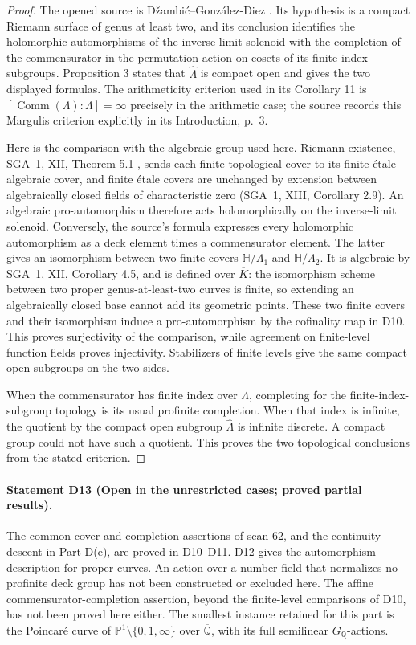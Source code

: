 \begin{proof}
The opened source is D\v zambi\'c--Gonz\'alez-Diez
\cite[Theorem 7 and Proposition 3]{D_DzambicGonzalezDiez}.
Its hypothesis is a compact Riemann surface of genus at least two,
and its conclusion identifies the holomorphic automorphisms of the
inverse-limit solenoid with the completion of the commensurator in
the permutation action on cosets of its finite-index subgroups.
Proposition 3 states that $\widehat\Lambda$ is compact open and gives
the two displayed formulas.  The arithmeticity criterion used in its
Corollary 11 is
$[\operatorname{Comm}(\Lambda):\Lambda]=\infty$ precisely in the
arithmetic case; the source records this Margulis criterion explicitly
in its Introduction, p.~3.

Here is the comparison with the algebraic group used here.  Riemann
existence, SGA~1, XII, Theorem 5.1 \cite{D_SGA1}, sends each finite
topological cover to its finite \'etale algebraic cover, and finite
\'etale covers are unchanged by extension between algebraically closed
fields of characteristic zero (SGA~1, XIII, Corollary 2.9).
An algebraic pro-automorphism therefore acts holomorphically on the
inverse-limit solenoid.  Conversely, the source's formula expresses
every holomorphic automorphism as a deck element times a commensurator
element.  The latter gives an isomorphism between two finite covers
$\mathbb H/\Lambda_1$ and $\mathbb H/\Lambda_2$.  It is algebraic by
SGA~1, XII, Corollary 4.5, and
is defined over $\overline K$: the isomorphism scheme between two
proper genus-at-least-two curves is finite, so extending an algebraically
closed base cannot add its geometric points.  These two finite covers
and their isomorphism induce a pro-automorphism by the cofinality map
in D10.  This proves surjectivity of the comparison, while agreement
on finite-level function fields proves injectivity.  Stabilizers of
finite levels give the same compact open subgroups on the two sides.

When the commensurator has finite index over $\Lambda$, completing for
the finite-index-subgroup topology is its usual profinite completion.
When that index is infinite, the quotient by the compact open subgroup
$\widehat\Lambda$ is infinite discrete.  A compact group could not have
such a quotient.  This proves the two topological conclusions from
the stated criterion.
\end{proof}

\paragraph{Statement D13 (Open in the unrestricted cases; proved partial results).}
\label{res:D13}
The common-cover and completion assertions of scan 62, and the
continuity descent in Part D(e), are proved in D10--D11.  D12 gives the
automorphism description for proper curves.  An action over a number
field that normalizes no profinite deck group has not been constructed
or excluded here.  The affine commensurator-completion assertion, beyond
the finite-level comparisons of D10, has not been proved here either.
The smallest instance retained for this part is the Poincar\'e curve of
$\mathbb P^1\setminus\{0,1,\infty\}$ over $\overline{\mathbb Q}$,
with its full semilinear $G_{\mathbb Q}$-actions.

